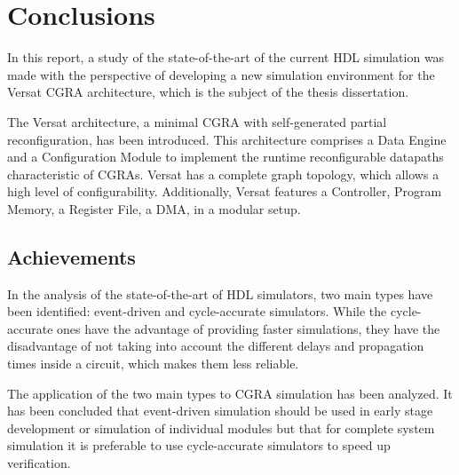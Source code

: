 
\chapter{Conclusions}
\label{chapter:conclusions}

In this report, a study of the state-of-the-art of the current HDL simulation
was made with the perspective of developing a new simulation environment for the
Versat CGRA architecture, which is the subject of the thesis dissertation.

The Versat architecture, a minimal CGRA with self-generated partial
reconfiguration, has been introduced. This architecture comprises a Data Engine
and a Configuration Module to implement the runtime reconfigurable datapaths
characteristic of CGRAs. Versat has a complete graph topology, which allows a
high level of configurability. Additionally, Versat features a Controller,
Program Memory, a Register File, a DMA, in a modular setup.

\section{Achievements}
\label{section:achievements}

In the analysis of the state-of-the-art of HDL simulators, two main types have
been identified: event-driven and cycle-accurate simulators. While the
cycle-accurate ones have the advantage of providing faster simulations, they
have the disadvantage of not taking into account the different delays and
propagation times inside a circuit, which makes them less reliable.

The application of the two main types to CGRA simulation has been
analyzed.  It has been concluded that event-driven simulation should be used in
early stage development or simulation of individual modules but that for
complete system simulation it is preferable to use cycle-accurate simulators to
speed up verification.

